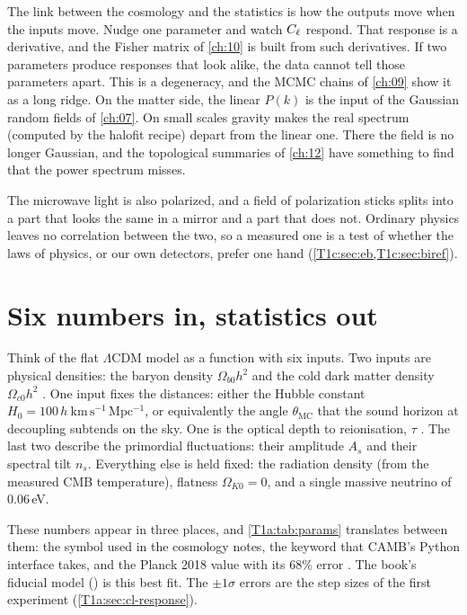 The link between the cosmology and the statistics is how the outputs move when the inputs move. Nudge one parameter and watch $C_\ell$ respond. That response is a derivative, and the Fisher matrix of \cref{ch:10} is built from such derivatives. If two parameters produce responses that look alike, the data cannot tell those parameters apart. This is a degeneracy, and the MCMC chains of \cref{ch:09} show it as a long ridge. On the matter side, the linear $P(k)$ is the input of the Gaussian random fields of \cref{ch:07}. On small scales gravity makes the real spectrum (computed by the halofit recipe) depart from the linear one. There the field is no longer Gaussian, and the topological summaries of \cref{ch:12} have something to find that the power spectrum misses.

The microwave light is also polarized, and a field of polarization sticks splits into a part that looks the same in a mirror and a part that does not. Ordinary physics leaves no correlation between the two, so a measured one is a test of whether the laws of physics, or our own detectors, prefer one hand (\cref{T1c:sec:eb,T1c:sec:biref}).

\section{Six numbers in, statistics out}
\label{T1a:sec:machine}

Think of the flat $\Lambda$CDM model as a function with six inputs.
Two inputs are physical densities: the baryon density $\Omega_{b0}h^2$ and the cold dark matter density $\Omega_{c0}h^2$ .
One input fixes the distances: either the Hubble constant $H_0=100\,h\ \mathrm{km\,s^{-1}\,Mpc^{-1}}$, or equivalently the angle $\theta_{\mathrm{MC}}$ that the sound horizon at decoupling subtends on the sky.
One is the optical depth to reionisation, $\tau$ .
The last two describe the primordial fluctuations: their amplitude $A_s$ and their spectral tilt $n_s$.
Everything else is held fixed: the radiation density (from the measured CMB temperature), flatness $\Omega_{K0}=0$, and a single massive neutrino of $0.06$\,eV.

These numbers appear in three places, and \cref{T1a:tab:params} translates between them: the symbol used in the cosmology notes, the keyword that CAMB's Python interface takes, and the Planck 2018 value with its 68\% error \cite[Table~1]{Planck2018VI}. The book's fiducial model () is this best fit. The $\pm1\sigma$ errors are the step sizes of the first experiment (\cref{T1a:sec:cl-response}).

